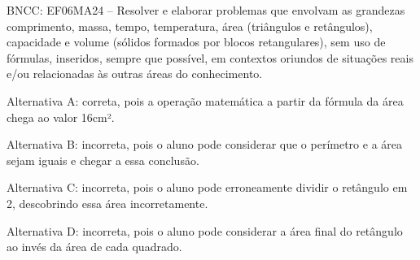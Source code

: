 \begin{enumerate}
BNCC: EF06MA24 -- Resolver e elaborar problemas que envolvam as
grandezas comprimento, massa, tempo, temperatura, área (triângulos e
retângulos), capacidade e volume (sólidos formados por blocos
retangulares), sem uso de fórmulas, inseridos, sempre que possível, em
contextos oriundos de situações reais e/ou relacionadas às outras áreas
do conhecimento.

Alternativa A: correta, pois a operação matemática a partir da fórmula
da área chega ao valor 16cm².

Alternativa B: incorreta, pois o aluno pode considerar que o perímetro e
a área sejam iguais e chegar a essa conclusão.

Alternativa C: incorreta, pois o aluno pode erroneamente dividir o
retângulo em 2, descobrindo essa área incorretamente.

Alternativa D: incorreta, pois o aluno pode considerar a área final do
retângulo ao invés da área de cada quadrado.

	\end{enumerate}


